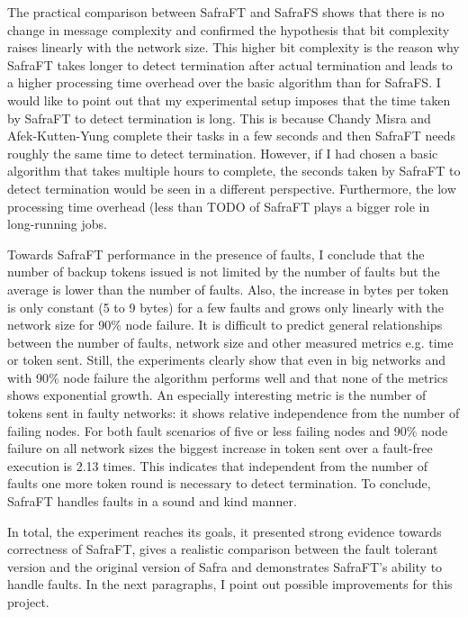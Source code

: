 The practical comparison between SafraFT and SafraFS shows that there is no change in message complexity and confirmed the hypothesis that bit complexity raises linearly with the network size.
This higher bit complexity is the reason why SafraFT takes longer to detect termination after actual termination and leads to a higher processing time overhead over the basic algorithm than for SafraFS.
I would like to point out that my experimental setup imposes that the time taken by SafraFT to detect termination is long.
This is because Chandy Misra and Afek-Kutten-Yung complete their tasks in a few seconds and then SafraFT needs roughly the same time to detect termination.
However, if I had chosen a basic algorithm that takes multiple hours to complete, the seconds taken by SafraFT to detect termination would be seen in a different perspective.
Furthermore, the low processing time overhead (less than TODO%
of SafraFT plays a bigger role in long-running jobs.

Towards SafraFT performance in the presence of faults, I conclude that the number of backup tokens issued is not limited by the number of faults but the average is lower than the number of faults.
Also, the increase in bytes per token is only constant (5 to 9 bytes) for a few faults and grows only linearly with the network size for 90\% node failure.  %
It is difficult to predict general relationships between the number of faults, network size and other measured metrics e.g. time or token sent.
Still, the experiments clearly show that even in big networks and with 90\% node failure the algorithm performs well and that none of the metrics shows exponential growth.
An especially interesting metric is the number of tokens sent in faulty networks: it shows relative independence from the number of failing nodes.
For both fault scenarios of five or less failing nodes and 90\% node failure on all network sizes the biggest increase in token sent over a fault-free execution is 2.13 times. %
This indicates that independent from the number of faults one more token round is necessary to detect termination.
To conclude, SafraFT handles faults in a sound and kind manner.

In total, the experiment reaches its goals, it presented strong evidence towards correctness of SafraFT, gives a realistic comparison between the fault tolerant version and the original version of Safra and demonstrates SafraFT's ability to handle faults.
In the next paragraphs, I point out possible improvements for this project.

